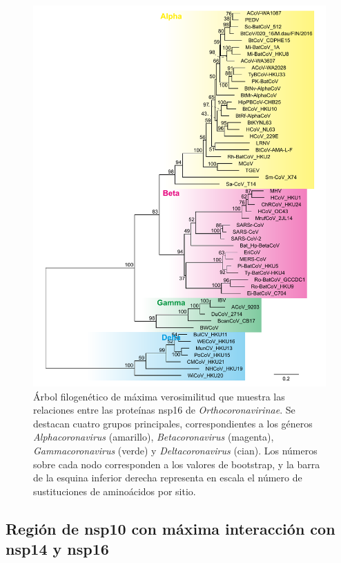 \begin{figure}[H]
    \centering
    \includegraphics[width=1\textwidth]{img/fig7.pdf}
    \caption{Árbol filogenético de máxima verosimilitud que muestra las 
    relaciones entre las proteínas nsp16 de \textit{Orthocoronavirinae}. Se 
    destacan cuatro grupos principales, correspondientes a los géneros
    \textit{Alphacoronavirus} (amarillo), \textit{Betacoronavirus} (magenta),
    \textit{Gammacoronavirus} (verde) y \textit{Deltacoronavirus} (cian). 
    Los números sobre cada nodo corresponden a los valores de bootstrap, y 
    la barra de la esquina inferior derecha representa en escala el número 
    de sustituciones de aminoácidos por sitio.}\label{fig:nsp16tree}
\end{figure}

\subsection{Región de nsp10 con máxima interacción con nsp14 y nsp16}

